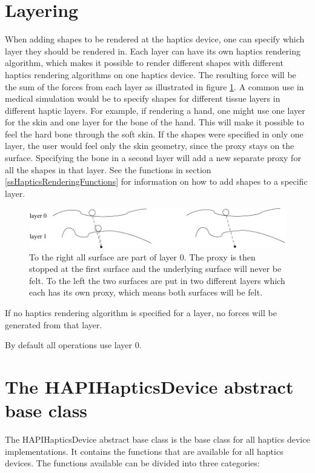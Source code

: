 \section{Layering}
When adding shapes to be rendered at the haptics device, one can
specify which layer they should be rendered in. Each layer can have
its own haptics rendering algorithm, which makes it possible to render
different shapes with different haptics rendering algorithms on one
haptics device. The resulting force will be the sum of the forces from
each layer as illustrated in figure \ref{Layering_fig}. A common use in
medical simulation would be to
specify shapes for different tissue layers in different haptic
layers. For example, if rendering a hand, one might use one layer for
the skin and one layer for the bone of the hand. This will make it
possible to feel the hard bone through the soft skin. If the shapes
were specified in only one layer, the user would feel only the skin
geometry, since the proxy stays on the surface. Specifying the bone in
a second layer will add a new separate proxy for all the shapes in
that layer. See the functions in section \ref{ssHapticsRenderingFunctions} for
information on how to add shapes to a specific layer.

\begin{figure} 
  \centering 
  \includegraphics{images/layering2.pdf}
  \caption{To the right all surface are part of layer 0. The proxy is then stopped at the first surface and the
underlying surface will never be felt. To the left the two surfaces are put in two different layers which
each has its own proxy, which means both surfaces will be felt.} 
  \label{Layering_fig} 
\end{figure}

If no haptics rendering algorithm is specified for a layer, no forces
will be generated from that layer.
 
By default all operations use layer 0.

\section{The HAPIHapticsDevice abstract base class}
The HAPIHapticsDevice abstract base class is the base class for all
haptics device implementations. It contains the functions that are
available for all haptics devices.  The functions available can be divided into three categories:

